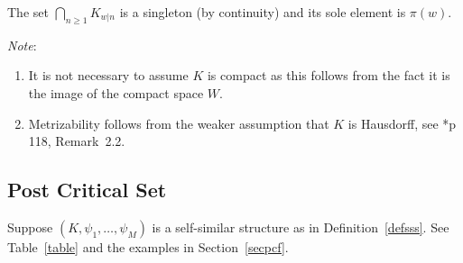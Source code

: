\documentclass[a4paper]{amsart}
\theoremstyle{plain}
\theoremstyle{definition}
\theoremstyle{remark}
\begin{document}
The set $ \bigcap_{n\geq 1 } K_{w|n } $ is a singleton (by continuity) and its sole element  is
 $  \pi(w) $.   

\medskip \noindent \emph{Note}: 
\begin{enumerate}

\item  It is not necessary to assume $ K $ is compact as this follows from the fact it is the image of the compact space $ W $.
\item Metrizability  follows from the weaker assumption that  $ K $ is Hausdorff, see \cite{Kam}*{p 118, Remark~2.2}.

\end{enumerate}

\subsection{Post Critical Set} \label{secsubss}
Suppose $(K,\psi_1,\dots,\psi_M)$ is a  self-similar  structure    as in Definition~\ref{defsss}.
See Table~\ref{table} and the examples in Section~\ref{secpcf}.
\end{document}
